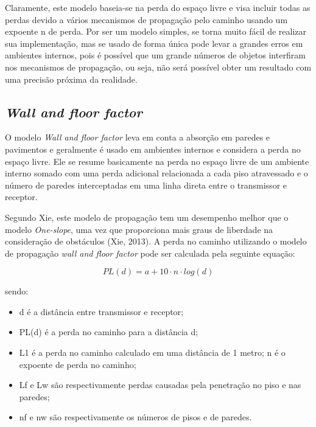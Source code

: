 \documentclass[
	12pt,				%
	openright,			%
	twoside,			%
	a4paper,			%
	english,			%
	french,				%
	spanish,			%
	brazil				%
	]{abntex2}
\begin{document}
Claramente, este modelo baseia-se na perda do espaço livre e visa incluir todas as perdas devido a vários mecanismos de propagação pelo caminho usando um expoente n de perda. Por ser um modelo simples, se torna muito fácil de realizar sua implementação, mas se usado de forma única pode levar a grandes erros em ambientes internos, pois é possível que um grande números de objetos interfiram nos mecanismos de propagação, ou seja, não será possível obter um resultado com uma precisão próxima da realidade.


\subsection[Wall and floor factor]{\textit{Wall and floor factor}}

O modelo \textit{Wall and floor factor} leva em conta a absorção em paredes e pavimentos e geralmente é usado em ambientes internos e considera a perda no espaço livre. Ele se resume basicamente na perda no espaço livre de um ambiente interno somado com uma perda adicional relacionada a cada piso atravessado e o número de paredes interceptadas em uma linha direta entre o transmissor e receptor.

Segundo Xie, este modelo de propagação tem um desempenho melhor que o modelo \textit{One-slope}, uma vez que proporciona mais graus de liberdade na consideração de obstáculos (Xie, 2013). A perda no caminho utilizando o modelo de propagação \textit{wall and floor factor} pode ser calculada pela seguinte equação:


\begin{equation}
PL(d) = a + 10 \cdot n \cdot log(d)
\end{equation}

sendo:

\begin{itemize}
	\item d é a distância entre transmissor e receptor;
	\item PL(d) é a perda no caminho para a distância d;
	\item L1 é a perda no caminho calculado em uma distância de 1 metro;
	n é o expoente de perda no caminho;
	\item Lf e Lw são respectivamente perdas causadas pela penetração no piso e nas paredes;
	\item nf e nw são respectivamente os números de pisos e de paredes.
\end{itemize}
\end{document}
